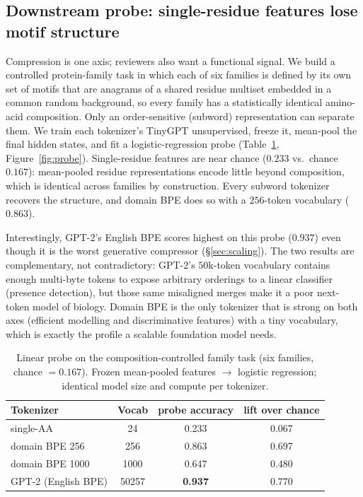 \documentclass[11pt]{article}
\begin{document}
\subsection{Downstream probe: single-residue features lose motif structure}
\label{sec:probe}
Compression is one axis; reviewers also want a functional signal. We build a
controlled protein-family task in which each of six families is defined by its
own set of motifs that are anagrams of a shared residue multiset embedded in a
common random background, so every family has a statistically identical
amino-acid composition. Only an order-sensitive (subword) representation can
separate them. We train each tokenizer's TinyGPT unsupervised, freeze it,
mean-pool the final hidden states, and fit a logistic-regression probe
(Table~\ref{tab:probe}, Figure~\ref{fig:probe}). Single-residue features are
near chance ($0.233$ vs.\ chance $0.167$): mean-pooled residue representations
encode little beyond composition, which is identical across families by
construction. Every subword tokenizer recovers the structure, and domain BPE
does so with a $256$-token vocabulary ($0.863$).

Interestingly, GPT-2's English BPE scores highest on this probe ($0.937$) even
though it is the worst generative compressor (\S\ref{sec:scaling}). The two
results are complementary, not contradictory: GPT-2's $50$k-token vocabulary
contains enough multi-byte tokens to expose arbitrary orderings to a linear
classifier (presence detection), but those same misaligned merges make it a poor
next-token model of biology. Domain BPE is the only tokenizer that is strong on
both axes (efficient modelling and discriminative features) with a tiny
vocabulary, which is exactly the profile a scalable foundation model needs.

\begin{table}[t]
\centering
\caption{Linear probe on the composition-controlled family task (six families,
chance $= 0.167$). Frozen mean-pooled features $\to$ logistic regression;
identical model size and compute per tokenizer.}
\label{tab:probe}
\begin{tabular}{lccc}
\toprule
Tokenizer & Vocab & probe accuracy & lift over chance \\
\midrule
single-AA           & 24    & 0.233 & 0.067 \\
domain BPE 256      & 256   & 0.863 & 0.697 \\
domain BPE 1000     & 1000  & 0.647 & 0.480 \\
GPT-2 (English BPE) & 50257 & \textbf{0.937} & 0.770 \\
\bottomrule
\end{tabular}
\end{table}
\end{document}
